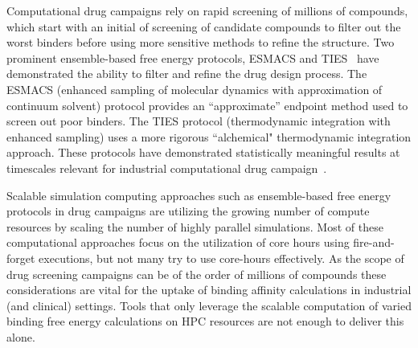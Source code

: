 
Computational drug campaigns rely on rapid screening of millions of compounds, 
which start with an initial of screening of candidate compounds to filter out 
the worst binders before using more sensitive methods to refine the structure. 
Two prominent ensemble-based free energy protocols, ESMACS and TIES~\cite{Bhati2017} 
have demonstrated the ability to filter and refine the drug design process. 
The ESMACS (enhanced sampling of molecular dynamics with approximation of continuum 
solvent) protocol provides an ``approximate'' endpoint method used to screen out 
poor binders. 
The TIES protocol (thermodynamic integration with enhanced sampling) uses a more 
rigorous ``alchemical" thermodynamic integration approach. 
These protocols have demonstrated statistically meaningful results at timescales 
relevant for industrial computational drug campaign~. 


Scalable simulation computing approaches such as ensemble-based free energy 
protocols in drug campaigns are utilizing the growing number of compute 
resources by scaling the number of highly parallel simulations. 
Most of these computational approaches focus on the utilization of core hours 
using fire-and-forget executions, but not many try to use core-hours effectively. 
As the scope of drug screening campaigns can be of the order of millions of compounds 
these considerations are vital for the uptake of binding affinity calculations in 
industrial (and clinical) settings. Tools that only leverage the scalable 
computation of varied binding free energy calculations on HPC resources are not 
enough to deliver this alone.




